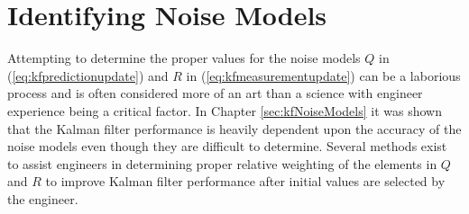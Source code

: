 \section{Identifying Noise Models}
\label{sec:kfIdentifyNoiseModels}
Attempting to determine the proper values for the noise models $Q$ in (\ref{eq:kfpredictionupdate}) and $R$ in (\ref{eq:kfmeasurementupdate}) can be a laborious process and is often considered more of an art than a science with engineer experience being a critical factor. In Chapter \ref{sec:kfNoiseModels} it was shown that the Kalman filter performance is heavily dependent upon the accuracy of the noise models even though they are difficult to determine. Several methods exist to assist engineers in determining proper relative weighting of the elements in $Q$ and $R$ to improve Kalman filter performance after initial values are selected by the engineer.

